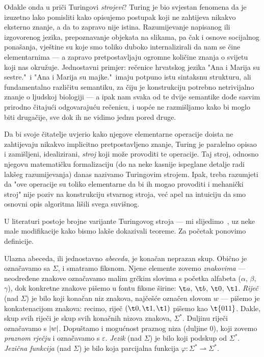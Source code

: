 Odakle onda u priči Turingovi \emph{strojevi}? Turing je bio svjestan fenomena da je izuzetno lako pomisliti kako opisujemo postupak koji ne zahtijeva nikakvo eksterno znanje, a da to zapravo nije istina. Razumijevanje napisanog ili izgovorenog jezika, prepoznavanje objekata na slikama, pa čak i osnove socijalnog ponašanja, vještine su koje smo toliko duboko internalizirali da nam se čine elementarnima --- a zapravo pretpostavljaju ogromne količine znanja o svijetu koji nas okružuje. Jednostavni primjer: rečenice hrvatskog jezika "Ana i Marija su sestre."\ i "Ana i Marija su majke."\ imaju potpuno istu sintaksnu strukturu, ali fundamentalno različitu semantiku, za čiju je konstrukciju potrebno netrivijalno znanje o ljudskoj biologiji --- a ipak nam svaka od te dvije semantike dođe sasvim prirodno čitajući odgovarajuću rečenicu, i uopće ne razmišljamo kako bi moglo biti drugačije, sve dok ih ne vidimo jednu pored druge.

Da bi svoje čitatelje uvjerio kako njegove elementarne operacije doista ne zahtijevaju nikakvo implicitno pretpostavljeno znanje, Turing je paralelno opisao i zamišljeni, idealizirani, \emph{stroj} koji može provoditi te operacije. Taj stroj, odnosno njegovu matematičku formalizaciju (do na neke kasnije ispeglane detalje radi lakšeg razumijevanja) danas nazivamo Turingovim strojem. Ipak, treba razumjeti da "ove operacije su toliko elementarne da bi ih mogao provoditi i mehanički stroj" nije poziv na konstrukciju stvarnog stroja, već apel na intuiciju da smo osnovni opis algoritma lišili svega suvišnog.

U literaturi postoje brojne varijante Turingovog stroja --- mi slijedimo~\cite{sipser}, uz neke male modifikacije kako bismo lakše dokazivali teoreme. Za početak ponovimo definicije.

Ulazna abeceda, ili jednostavno \emph{abeceda}, je konačan neprazan skup. Obično je označavamo sa $\Sigma$, i smatramo fiksnom. Njene elemente zovemo \emph{znakovima} --- ne\-od\-re\-đe\-ne znakove označavamo malim grčkim slovima s početka alfabeta ($\alpha$, $\beta$, $\gamma$), dok konkretne znakove pišemo u fontu fiksne širine: $\t a$, $\t b$, $\t 0$, $\t 1$. \emph{Riječ} (nad $\Sigma$) je bilo koji konačan niz znakova, najčešće označen slovom $w$ --- pišemo je konkatenacijom znakova: recimo, riječ $(\t0,\t1,\t1)$ pišemo kao $\t{011}$. Dakle, skup svih riječi je skup svih konačnih nizova znakova, $\Sigma^*$. Duljinu riječi označavamo s $\lvert w\rvert$. Dopuštamo i mogućnost praznog niza (duljine $0$), koji zovemo \emph{praznom rječju} i označavamo s $\varepsilon$. \emph{Jezik} (nad $\Sigma$) je bilo koji podskup od $\Sigma^*$. \emph{Jezična funkcija} (nad $\Sigma$) je bilo koja parcijalna funkcija $\varphi\colon\Sigma^*\rightharpoonup\Sigma^*$.

